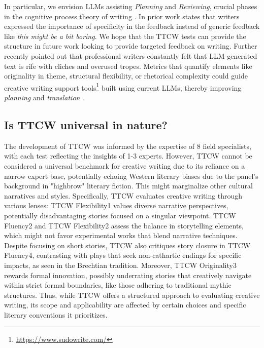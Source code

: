 In particular, we envision LLMs assisting \textit{Planning} and \textit{Reviewing}, crucial phases in the cognitive process theory of writing \cite{flower1981cognitive}. In prior work \citet{gero2023social} states that writers expressed the importance of specificity in the feedback instead of generic feedback like \textit{this might be a bit boring}. We hope that the TTCW tests can provide the structure in future work looking to provide targeted feedback on writing. Further \citet{ippolito2022creative} recently pointed out that professional writers constantly felt that LLM-generated text is rife with cliches and overused tropes. Metrics that quantify elements like originality in theme, structural flexibility, or rhetorical complexity could guide creative writing support tools\footnote{\url{https://www.sudowrite.com/}} built using current LLMs, thereby improving \textit{planning} and \textit{translation} \cite{10.1145/3461778.3462050}.

\subsection{Is TTCW universal in nature?}

The development of TTCW was informed by the expertise of 8 field specialists, with each test reflecting the insights of 1-3 experts. However, TTCW cannot be considered a universal benchmark for creative writing due to its reliance on a narrow expert base, potentially echoing Western literary biases due to the panel's background in "highbrow" literary fiction. This might marginalize other cultural narratives and styles. Specifically, TTCW evaluates creative writing through various lenses: TTCW Flexibility1 values diverse narrative perspectives, potentially disadvantaging stories focused on a singular viewpoint. TTCW Fluency2 and TTCW Flexibility2 assess the balance in storytelling elements, which might not favor experimental works that blend narrative techniques. Despite focusing on short stories, TTCW also critiques story closure in TTCW Fluency4, contrasting with plays that seek non-cathartic endings for specific impacts, as seen in the Brechtian tradition. Moreover, TTCW Originality3 rewards formal innovation, possibly underrating stories that creatively navigate within strict formal boundaries, like those adhering to traditional mythic structures. Thus, while TTCW offers a structured approach to evaluating creative writing, its scope and applicability are affected by certain choices and specific literary conventions it prioritizes.